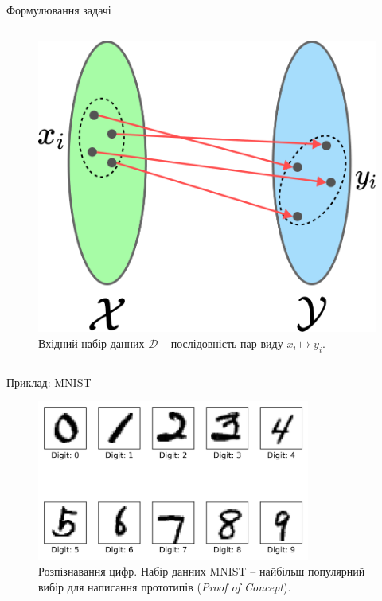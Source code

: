 \documentclass{zkdl-presentation-template}
\begin{document}
\begin{frame}{Формулювання задачі}
\begin{columns}
            \begin{column}{0.4\textwidth}
                \begin{figure}
                \centering
                \includegraphics[width=1\textwidth]{images/mapping.png}
                \caption{Вхідний набір данних $\mathcal{D}$ -- послідовність пар виду $x_i \mapsto y_i$.}
                \end{figure}
            \end{column}
        \end{columns}
	\end{frame}

    \begin{frame}{Приклад: MNIST}	
        \begin{figure}
            \centering
            \includegraphics[width=0.8\textwidth]{images/mnist.png}
            \caption{Розпізнавання цифр. Набір данних MNIST -- найбільш популярний вибір для написання прототипів (\textit{Proof of Concept}).}
        \end{figure}
    \end{frame}
\end{document}
